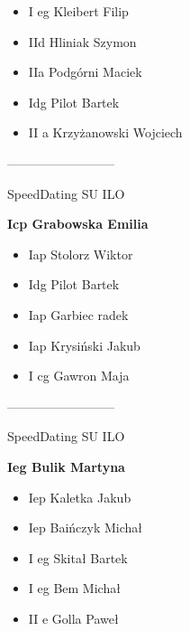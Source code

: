 \documentclass[a4paper,10pt]{article}
\begin{document}
\begin{multicols}{3}
\begin{minipage}[l]{\textwidth}
  \begin{itemize}
    \item I eg Kleibert Filip
    \item IId Hliniak Szymon
    \item IIa Podgórni Maciek
    \item Idg Pilot Bartek
    \item II a Krzyżanowski Wojciech

    \end{itemize}



\end{minipage}



\begin{minipage}[l]{\textwidth}
--------------------------

  \footnotesize{SpeedDating SU ILO}

  \bfseries{Icp Grabowska Emilia}

  \begin{itemize}
    \item Iap Stolorz Wiktor
    \item Idg Pilot Bartek
    \item Iap Garbiec radek
    \item Iap Krysiński Jakub
    \item I cg Gawron Maja

    \end{itemize}



\end{minipage}



\begin{minipage}[l]{\textwidth}
--------------------------

  \footnotesize{SpeedDating SU ILO}

  \bfseries{Ieg Bulik Martyna}

  \begin{itemize}
    \item Iep Kaletka Jakub
    \item Iep Baińczyk Michał
    \item I eg Skitał Bartek
    \item I eg Bem Michał
    \item II e Golla Paweł

    \end{itemize}




\end{minipage}
\end{multicols}
\end{document}
